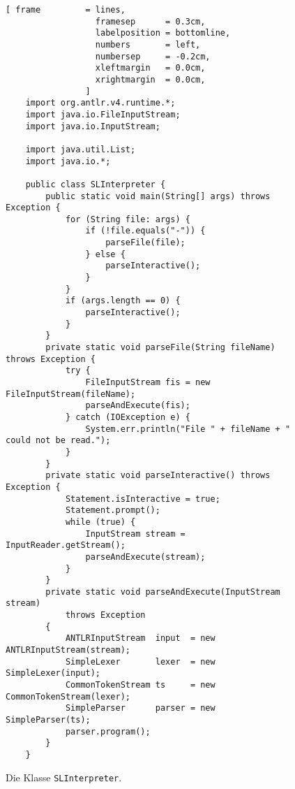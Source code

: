 \begin{figure}[!ht]
\centering
\begin{Verbatim}[ frame         = lines, 
                  framesep      = 0.3cm, 
                  labelposition = bottomline,
                  numbers       = left,
                  numbersep     = -0.2cm,
                  xleftmargin   = 0.0cm,
                  xrightmargin  = 0.0cm,
                ]
    import org.antlr.v4.runtime.*;
    import java.io.FileInputStream;
    import java.io.InputStream;
    
    import java.util.List;
    import java.io.*;
    
    public class SLInterpreter {
        public static void main(String[] args) throws Exception {
            for (String file: args) {
                if (!file.equals("-")) {
                    parseFile(file);
                } else {
                    parseInteractive();
                }
            }
            if (args.length == 0) {
                parseInteractive();
            }
        }
        private static void parseFile(String fileName) throws Exception {
            try {
                FileInputStream fis = new FileInputStream(fileName);
                parseAndExecute(fis);
            } catch (IOException e) {
                System.err.println("File " + fileName + " could not be read.");
            }
        }
        private static void parseInteractive() throws Exception {
            Statement.isInteractive = true;
            Statement.prompt();
            while (true) {
                InputStream stream = InputReader.getStream();
                parseAndExecute(stream);
            }
        }
        private static void parseAndExecute(InputStream stream) 
            throws Exception 
        {
            ANTLRInputStream  input  = new ANTLRInputStream(stream);
            SimpleLexer       lexer  = new SimpleLexer(input);
            CommonTokenStream ts     = new CommonTokenStream(lexer);
            SimpleParser      parser = new SimpleParser(ts);
            parser.program();
        }
    }
\end{Verbatim}
\vspace*{-0.3cm}
\caption{Die Klasse \texttt{SLInterpreter}.}
\label{fig:SLInterpreter.java}
\end{figure}





